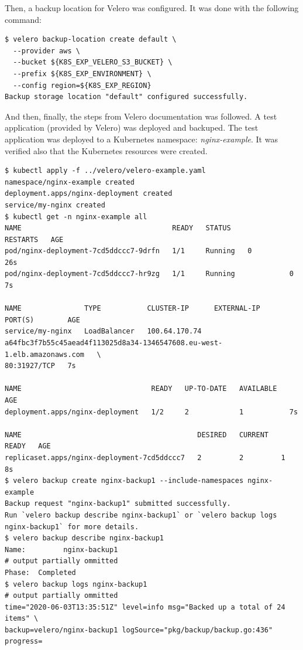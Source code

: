 Then, a backup location for Velero was configured. It was done with the following command:
\begin{lstlisting}[basicstyle=\tiny,caption={Choosing a backup storage location for Velero}]
$ velero backup-location create default \
  --provider aws \
  --bucket ${K8S_EXP_VELERO_S3_BUCKET} \
  --prefix ${K8S_EXP_ENVIRONMENT} \
  --config region=${K8S_EXP_REGION}
Backup storage location "default" configured successfully.
\end{lstlisting}

And then, finally, the steps from Velero documentation was followed\cite{velero-examples}. A test application (provided by Velero) was deployed and backuped. The test application was deployed to a Kubernetes namespace: \textit{nginx-example}.   It was verified also that the Kubernetes resources were created.
\begin{lstlisting}[basicstyle=\tiny,caption={Testing backup operation}]
$ kubectl apply -f ../velero/velero-example.yaml
namespace/nginx-example created
deployment.apps/nginx-deployment created
service/my-nginx created
$ kubectl get -n nginx-example all
NAME                                    READY   STATUS              RESTARTS   AGE
pod/nginx-deployment-7cd5ddccc7-9drfn   1/1     Running   0          26s
pod/nginx-deployment-7cd5ddccc7-hr9zg   1/1     Running             0          7s

NAME               TYPE           CLUSTER-IP      EXTERNAL-IP        PORT(S)        AGE
service/my-nginx   LoadBalancer   100.64.170.74   a64fbc3f7b55c45aead4f113025d8a34-1346547608.eu-west-1.elb.amazonaws.com   \
80:31927/TCP   7s

NAME                               READY   UP-TO-DATE   AVAILABLE   AGE
deployment.apps/nginx-deployment   1/2     2            1           7s

NAME                                          DESIRED   CURRENT   READY   AGE
replicaset.apps/nginx-deployment-7cd5ddccc7   2         2         1       8s
$ velero backup create nginx-backup1 --include-namespaces nginx-example
Backup request "nginx-backup1" submitted successfully.
Run `velero backup describe nginx-backup1` or `velero backup logs nginx-backup1` for more details.
$ velero backup describe nginx-backup1
Name:         nginx-backup1
# output partially ommitted
Phase:  Completed
$ velero backup logs nginx-backup1
# output partially ommitted
time="2020-06-03T13:35:51Z" level=info msg="Backed up a total of 24 items" \
backup=velero/nginx-backup1 logSource="pkg/backup/backup.go:436" progress=
\end{lstlisting}

